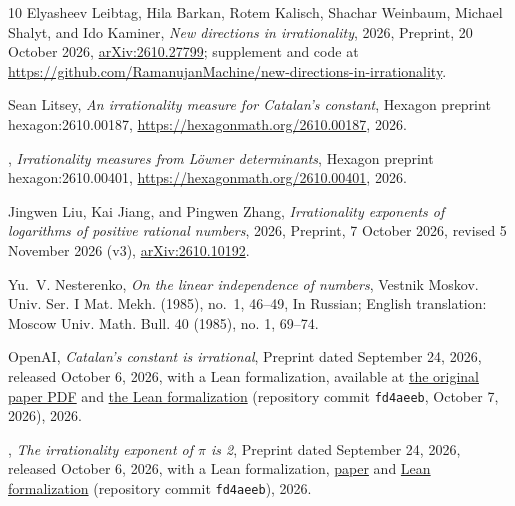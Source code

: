 \documentclass[11pt]{amsart}
\theoremstyle{definition}
\theoremstyle{remark}
\numberwithin{equation}{section}
\begin{document}
\begin{thebibliography}{10}
Elyasheev Leibtag, Hila Barkan, Rotem Kalisch, Shachar Weinbaum, Michael
  Shalyt, and Ido Kaminer, \emph{New directions in irrationality}, 2026,
  Preprint, 20 October 2026,
  \href{https://arxiv.org/abs/2610.27799}{arXiv:2610.27799}; supplement and
  code at
  \url{https://github.com/RamanujanMachine/new-directions-in-irrationality}.

Sean Litsey, \emph{An irrationality measure for {C}atalan's constant}, Hexagon
  preprint hexagon:2610.00187, \url{https://hexagonmath.org/2610.00187}, 2026.

\bysame, \emph{Irrationality measures from {L\"owner} determinants}, Hexagon
  preprint hexagon:2610.00401, \url{https://hexagonmath.org/2610.00401}, 2026.

Jingwen Liu, Kai Jiang, and Pingwen Zhang, \emph{Irrationality exponents of
  logarithms of positive rational numbers}, 2026, Preprint, 7 October 2026,
  revised 5 November 2026 (v3),
  \href{https://arxiv.org/abs/2610.10192}{arXiv:2610.10192}.

Yu.~V. Nesterenko, \emph{On the linear independence of numbers}, Vestnik
  Moskov. Univ. Ser. I Mat. Mekh. (1985), no.~1, 46--49, In Russian; English
  translation: Moscow Univ. Math. Bull. 40 (1985), no. 1, 69--74.

{OpenAI}, \emph{Catalan's constant is irrational}, Preprint dated September 24,
  2026, released October 6, 2026, with a Lean formalization, available at
  \href{https://github.com/openai/math/blob/fd4aeeb2ee4fc729c18d98444fed42fd0529eeeb/preprints/Catalans-constant-is-irrational-September-24-2026/paper.pdf}{the
  original paper PDF} and
  \href{https://github.com/openai/math/tree/fd4aeeb2ee4fc729c18d98444fed42fd0529eeeb/lean/OAI/NumberTheory/Catalan}{the
  Lean formalization} (repository commit \texttt{fd4aeeb}, October 7, 2026),
  2026.

\bysame, \emph{The irrationality exponent of {$\pi$} is 2}, Preprint dated
  September 24, 2026, released October 6, 2026, with a Lean formalization,
  \href{https://github.com/openai/math/tree/fd4aeeb2ee4fc729c18d98444fed42fd0529eeeb/preprints/The-irrationality-exponent-of-pi-is-2-September-24-2026}{paper}
  and
  \href{https://github.com/openai/math/tree/fd4aeeb2ee4fc729c18d98444fed42fd0529eeeb/lean/OAI/NumberTheory/PiExponent}{Lean
  formalization} (repository commit \texttt{fd4aeeb}), 2026.


\end{thebibliography}
\end{document}
